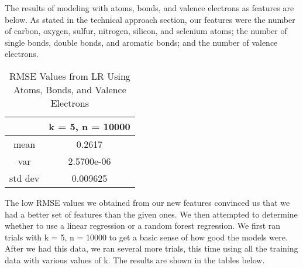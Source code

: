 \documentclass[12pt]{article}
\begin{document}
\medskip

The results of modeling with atoms, bonds, and valence electrons as features are below. As stated in the technical approach section, our features were the number of carbon, oxygen, sulfur, nitrogen, silicon, and selenium atoms; the number of single bonds, double bonds, and aromatic bonds; and the number of valence electrons. \\

\begin{table}[h!]
\centering
\begin{tabular} {c | c }
&  k = 5, n = 10000 \\ \hline
mean & 0.2617 \\
var & 2.5700e-06 \\
std dev & 0.009625 \\
\end{tabular}
\caption{RMSE Values from LR Using Atoms, Bonds, and Valence Electrons}
\label{table:3}
\end{table}

\medskip

\pagebreak

The low RMSE values we obtained from our new features convinced us that we had a better set of features than the given ones. We then attempted to determine whether to use a linear regression or a random forest regression. We first ran trials with k = 5, n = 10000 to get a basic sense of how good the models were. After we had this data, we ran several more trials, this time using all the training data with various values of k. The results are shown in the tables below. \\
\end{document}
